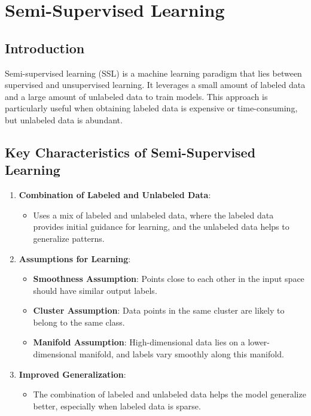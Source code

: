 \section{Semi-Supervised Learning}

\subsection*{Introduction}
Semi-supervised learning (SSL) is a machine learning paradigm that lies between supervised and unsupervised learning. It leverages a small amount of labeled data and a large amount of unlabeled data to train models. This approach is particularly useful when obtaining labeled data is expensive or time-consuming, but unlabeled data is abundant.

\subsection*{Key Characteristics of Semi-Supervised Learning}

\begin{enumerate}
    \item \textbf{Combination of Labeled and Unlabeled Data}:
    \begin{itemize}
        \item Uses a mix of labeled and unlabeled data, where the labeled data provides initial guidance for learning, and the unlabeled data helps to generalize patterns.
    \end{itemize}
    \item \textbf{Assumptions for Learning}:
    \begin{itemize}
        \item \textbf{Smoothness Assumption}: Points close to each other in the input space should have similar output labels.
        \item \textbf{Cluster Assumption}: Data points in the same cluster are likely to belong to the same class.
        \item \textbf{Manifold Assumption}: High-dimensional data lies on a lower-dimensional manifold, and labels vary smoothly along this manifold.
    \end{itemize}
    \item \textbf{Improved Generalization}:
    \begin{itemize}
        \item The combination of labeled and unlabeled data helps the model generalize better, especially when labeled data is sparse.
    \end{itemize}
\end{enumerate}

